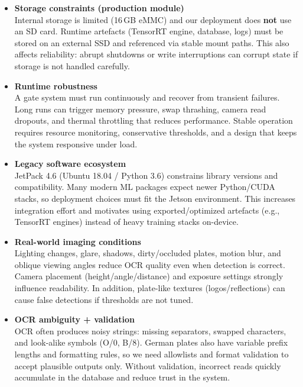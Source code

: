 \documentclass[25pt,a0paper,portrait]{tikzposter}
\begin{document}
\begin{columns}
{{\begin{itemize}
						\item \textbf{Storage constraints (production module)}\\
						Internal storage is limited (16\,GB eMMC) and our deployment does \textbf{not} use an SD card. Runtime artefacts (TensorRT engine, database, logs) must be stored on an external SSD and referenced via stable mount paths. This also affects reliability: abrupt shutdowns or write interruptions can corrupt state if storage is not handled carefully.
						
						\item \textbf{Runtime robustness}\\
						A gate system must run continuously and recover from transient failures. Long runs can trigger memory pressure, swap thrashing, camera read dropouts, and thermal throttling that reduces performance. Stable operation requires resource monitoring, conservative thresholds, and a design that keeps the system responsive under load.
						
						\item \textbf{Legacy software ecosystem}\\
						JetPack 4.6 (Ubuntu 18.04 / Python 3.6) constrains library versions and compatibility. Many modern ML packages expect newer Python/CUDA stacks, so deployment choices must fit the Jetson environment. This increases integration effort and motivates using exported/optimized artefacts (e.g., TensorRT engines) instead of heavy training stacks on-device.
						
						\item \textbf{Real-world imaging conditions}\\
						Lighting changes, glare, shadows, dirty/occluded plates, motion blur, and oblique viewing angles reduce OCR quality even when detection is correct. Camera placement (height/angle/distance) and exposure settings strongly influence readability. In addition, plate-like textures (logos/reflections) can cause false detections if thresholds are not tuned.
						
						\item \textbf{OCR ambiguity + validation}\\
						OCR often produces noisy strings: missing separators, swapped characters, and look-alike symbols (O/0, B/8). German plates also have variable prefix lengths and formatting rules, so we need allowlists and format validation to accept plausible outputs only. Without validation, incorrect reads quickly accumulate in the database and reduce trust in the system.
						

\end{itemize}}}
\end{columns}
\end{document}

